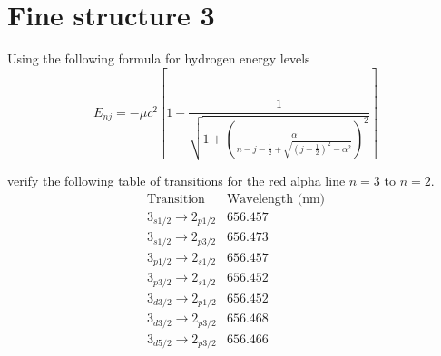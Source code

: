 

\section*{Fine structure 3}

Using the following formula for hydrogen energy levels
\begin{equation*}
E_{nj}=-\mu c^2\left[1-\frac{1}{\sqrt{\displaystyle1
+\left(\frac{\alpha}{n-j-\frac{1}{2}+\sqrt{\left(j+\frac{1}{2}\right)^2-\alpha^2}}\right)^2}}\right]
\end{equation*}

verify the following table of transitions for the red alpha line $n=3$ to $n=2$.
\begin{equation*}
\begin{matrix}
\text{Transition} & \text{Wavelength (nm)}
\\[1ex]
3_{s1/2}\rightarrow2_{p1/2} & 656.457
\\
3_{s1/2}\rightarrow2_{p3/2} & 656.473
\\[1ex]
3_{p1/2}\rightarrow2_{s1/2} & 656.457
\\
3_{p3/2}\rightarrow2_{s1/2} & 656.452
\\[1ex]
3_{d3/2}\rightarrow2_{p1/2} & 656.452
\\
3_{d3/2}\rightarrow2_{p3/2} & 656.468
\\
3_{d5/2}\rightarrow2_{p3/2} & 656.466
\end{matrix}
\end{equation*}


